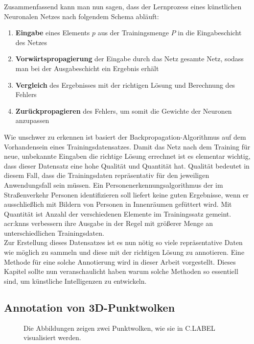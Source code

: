 Zusammenfassend kann man nun sagen, dass der Lernprozess eines künstlichen Neuronalen Netzes nach folgendem Schema abläuft:

\begin{enumerate}
\item \textbf{Eingabe} eines Elements \(p\) aus der Trainingsmenge \(P\) in die Eingabeschicht des Netzes
\item \textbf{Vorwärtspropagierung} der Eingabe durch das Netz gesamte Netz, sodass man bei der Ausgabeschicht ein Ergebnis erhält
\item \textbf{Vergleich} des Ergebnisses mit der richtigen Lösung und Berechnung des Fehlers
\item \textbf{Zurückpropagieren} des Fehlers, um somit die Gewichte der Neuronen anzupassen
\end{enumerate}

Wie unschwer zu erkennen ist basiert der Backpropagation-Algorithmus auf dem Vorhandensein eines Trainingsdatensatzes. Damit das Netz nach dem Training für neue, unbekannte Eingaben die richtige Lösung errechnet ist es elementar wichtig, dass dieser Datensatz eine hohe Qualität und Quantität hat. Qualität bedeutet in diesem Fall, dass die Trainingsdaten repräsentativ für den jeweiligen Anwendungsfall sein müssen. Ein Personenerkennungsalgorithmus der im Straßenverkehr Personen identifizieren soll liefert keine guten Ergebnisse, wenn er ausschließlich mit Bildern von Personen in Innenräumen gefüttert wird. Mit Quantität ist Anzahl der verschiedenen Elemente im Trainingssatz gemeint. \acrshort{acr:knn}s verbessern ihre Ausgabe in der Regel mit größerer Menge an unterschiedlichen Trainingsdaten.\\

Zur Erstellung dieses Datensatzes ist es nun nötig so viele repräsentative Daten wie möglich zu sammeln und diese mit der richtigen Lösung zu annotieren. Eine Methode für eine solche Annotierung wird in dieser Arbeit vorgestellt. Dieses Kapitel sollte nun veranschaulicht haben warum solche Methoden so essentiell sind, um künstliche Intelligenzen zu entwickeln.


\subsection{Annotation von 3D-Punktwolken}
\label{sec:CloudAnnotation}

\begin{figure}%
    \centering
    \quad
    \caption{Die Abbildungen zeigen zwei Punktwolken, wie sie in C.LABEL visualisiert werden.}\label{fig:C.LABELclouds}%
\end{figure}

